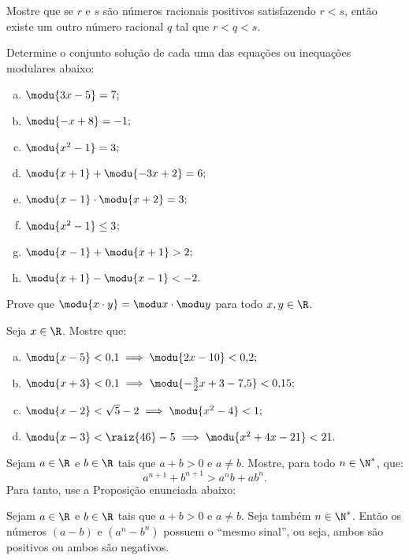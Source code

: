 \begin{exercise}
  Mostre que se $r$ e $s$ são números racionais positivos satisfazendo $r < s$,
  então existe um outro número racional $q$ tal que $r<q<s$.
\end{exercise}

\begin{exercise}
Determine o conjunto solução de cada uma das equações ou
inequações modulares abaixo:
\begin{enumerate}[a)]
  \item $\modu {3x - 5}= 7;$
  \item $\modu {-x +8} = -1;$
  \item $\modu{x^2 - 1}= 3;$
  \item $\modu{x +1} + \modu { -3x +2} = 6;$
  \item $\modu{x-1} \cdot \modu{x+2} = 3;$
  \item $\modu{x^2-1}\le 3$;
  \item $\modu{x-1}+ \modu{x+1}>2;$
  \item $\modu{x+1}- \modu{x-1}<-2.$
\end{enumerate}
\end{exercise}

\begin{exercise}
Prove que $\modu{x\cdot y } = \modu x \cdot \modu y$ para todo
$x, y \in \R$.
\end{exercise}

\begin{exercise}
Seja $x \in \R$. Mostre que:
\begin{enumerate}[a)]
    \item $\modu{x-5}<0{,}1 \implies \modu{2x - 10}< 0{,}2;$
    \item $\modu{x+3}<0{,}1 \implies \modu{-\frac 3 2 x + 3 -
    7{,}5}<0{,}15;$
    \item $\modu{x-2}< \sqrt{5} - 2 \implies \modu{x^2 - 4}< 1;$
    \item $\modu{ x - 3 } < \raiz{46} - 5 \implies \modu{ x^2 + 4x - 21 } < 21.$
\end{enumerate}
\end{exercise}

\begin{exercise}
  Sejam $a \in \R$ e $b \in \R$ tais que $a+b>0$ e $a \neq b$. Mostre, para todo $n \in \N^\ast$, que:
  $$ a^{n+1} + b^{n+1} > a^n b + ab^n.$$
  Para tanto, use a Proposição enunciada abaixo:
  \begin{proposition}
    Sejam $a \in \R$ e $b \in \R$ tais que $a+b>0$ e $a \neq b$. Seja também $n \in \N^\ast$. Então os números $(a-b)$ e $(a^n-b^n)$ possuem o ``mesmo sinal'', ou seja, ambos são positivos ou ambos são negativos.
  \end{proposition}
\end{exercise}

